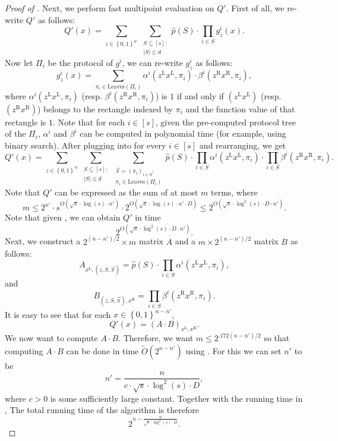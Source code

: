 \documentclass[10pt,a4paper]{article}
\newcommand{\bool}{\left\{0,1\right\}}
\newcommand{\LH}[1]{#1^{\mathrm{L}}}
\newcommand{\RH}[1]{#1^{\mathrm{R}}}
\begin{document}
\begin{proof}[Proof of ]
		Next, we perform fast multipoint evaluation on $Q'$. First of all, we re-write $Q'$ as follows:
		\begin{equation}\label{eq:sat-2}
			Q'(x) = \sum_{z\in\bool^{n'}} \sum_{\substack{S\subseteq[s]: \\ |S|\leq d}}\hat{p}(S)\cdot\prod_{i\in S}g^i_z(x).
		\end{equation}
		Now let $\Pi_i$ be the protocol of $g^i$, we can re-write $g^i_z$ as follows:
		\begin{equation}\label{eq:sat-3}
		    g^i_z(x)=\sum_{\pi_i\in\mathrm{Leaves}(\Pi_i)} \alpha^i\left(\LH{z}\LH{x},\pi_i\right)\cdot \beta^{i}\left(\RH{z}\RH{x},\pi_i\right),
		\end{equation}
		where $\alpha^i\left(\LH{z}\LH{x},\pi_i\right)$ (resp. $\beta^{i}\left(\RH{z}\RH{x},\pi_i\right)$) is $1$ if and only if $\left(\LH{z}\LH{x}\right)$ (resp. $\left(\RH{z}\RH{x}\right)$) belongs to the rectangle indexed by $\pi_i$ and the function value of that rectangle is $1$. Note that for each $i\in[s]$, given the pre-computed protocol tree of the $\Pi_i$, $\alpha^{i}$ and $\beta^{i}$ can be computed in polynomial time (for example, using binary search).
		After plugging  into  for every $i\in[s]$ and rearranging, we get
		\begin{equation}\label{eq:sat-4}
		    Q'(x) = \sum_{z\in\bool^{n'}} \sum_{\substack{S\subseteq[s]: \\ |S|\leq d}} \sum_{\substack{\vec{\pi}=(\pi_i)_{i\in S}: \\ \pi_i\in\mathrm{Leaves}(\Pi_i)}} \hat{p}(S)\cdot \prod_{i\in S} \alpha^i\left(\LH{z}\LH{x},\pi_i\right)\cdot \prod_{i\in S} \beta^{i}\left(\RH{z}\RH{x},\pi_i\right).
		\end{equation}
		Note that $Q'$ can be expressed as the sum of at most $m$ terms, where
		\[
			m\leq 2^{n'}\cdot s^{O(\sqrt{s}\cdot \log(s)\cdot n')}\cdot 2^{O(\sqrt{s}\cdot \log(s)\cdot n'\cdot D)}\leq 2^{O(\sqrt{s}\cdot\log^2(s)\cdot D\cdot n')}.
		\]
		Note that given , we can obtain $Q'$ in time
		\begin{equation}\label{eq:sat-time-1}
		    2^{O(\sqrt{s}\cdot\log^2(s)\cdot D\cdot n')}.
		\end{equation}
		Next, we construct a $2^{(n-n')/2} \times m$ matrix $A$ and a $m \times 2^{(n-n')/2}$ matrix $B$ as follows:
		\[
			A_{\LH{x},(z,S,\vec{\pi})}=\hat{p}(S)\cdot\prod_{i\in S} \alpha^i\left(\LH{z}\LH{x},\pi_i\right),
		\]
		and 
		\[
			B_{(z,S,\vec{\pi}),\RH{x}}=\prod_{i\in S} \beta^{i}\left(\RH{z}\RH{x},\pi_i\right).
		\]
		It is easy to see that for each $x\in\bool^{n-n'}$,
		\[
			Q'(x) = (A\cdot B)_{\LH{x},\RH{x}}.
		\]
		We now want to compute $A\cdot B$. Therefore, we want $m \leq 2^{.172(n-n')/2}$ so that computing $A\cdot B$ can be done in time $\tilde{O}(2^{n-n'})$ using . For this we can set $n'$ to be
		\[
			n'=\frac{n}{c\cdot\sqrt{s}\cdot \log^{2}(s)\cdot D},
		\]
		where $c>0$ is some sufficiently large constant. Together with the running time in , The total running time of the algorithm is therefore
		\[
		    2^{n-\frac{n}{\sqrt{s}\cdot\log^2(s)\cdot D}}.
		\]
		

\end{proof}
\end{document}
